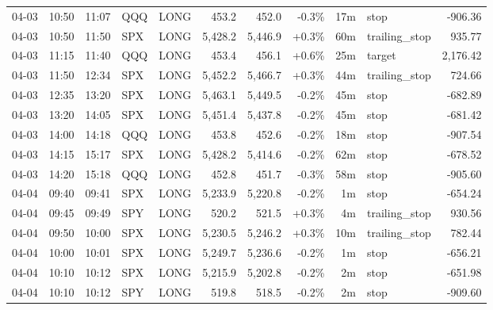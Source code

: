 \documentclass[11pt,a4paper,twoside]{article}
\begin{document}
\begin{center}
\begin{longtable}{>{\color{txtmain}}l l l l l r r r r >{\color{txtmain}}l r}
04-03 & 10:50 & 11:07 & QQQ & LONG & 453.2 & 452.0 & \textcolor{lossred}{-0.3\%} & 17m & stop & \textcolor{lossred}{-906.36} \\
04-03 & 10:50 & 11:50 & SPX & LONG & 5,428.2 & 5,446.9 & \textcolor{wingreen}{+0.3\%} & 60m & trailing\_stop & \textcolor{wingreen}{935.77} \\
04-03 & 11:15 & 11:40 & QQQ & LONG & 453.4 & 456.1 & \textcolor{wingreen}{+0.6\%} & 25m & target & \textcolor{wingreen}{2,176.42} \\
04-03 & 11:50 & 12:34 & SPX & LONG & 5,452.2 & 5,466.7 & \textcolor{wingreen}{+0.3\%} & 44m & trailing\_stop & \textcolor{wingreen}{724.66} \\
04-03 & 12:35 & 13:20 & SPX & LONG & 5,463.1 & 5,449.5 & \textcolor{lossred}{-0.2\%} & 45m & stop & \textcolor{lossred}{-682.89} \\
04-03 & 13:20 & 14:05 & SPX & LONG & 5,451.4 & 5,437.8 & \textcolor{lossred}{-0.2\%} & 45m & stop & \textcolor{lossred}{-681.42} \\
04-03 & 14:00 & 14:18 & QQQ & LONG & 453.8 & 452.6 & \textcolor{lossred}{-0.2\%} & 18m & stop & \textcolor{lossred}{-907.54} \\
04-03 & 14:15 & 15:17 & SPX & LONG & 5,428.2 & 5,414.6 & \textcolor{lossred}{-0.2\%} & 62m & stop & \textcolor{lossred}{-678.52} \\
04-03 & 14:20 & 15:18 & QQQ & LONG & 452.8 & 451.7 & \textcolor{lossred}{-0.3\%} & 58m & stop & \textcolor{lossred}{-905.60} \\
04-04 & 09:40 & 09:41 & SPX & LONG & 5,233.9 & 5,220.8 & \textcolor{lossred}{-0.2\%} & 1m & stop & \textcolor{lossred}{-654.24} \\
04-04 & 09:45 & 09:49 & SPY & LONG & 520.2 & 521.5 & \textcolor{wingreen}{+0.3\%} & 4m & trailing\_stop & \textcolor{wingreen}{930.56} \\
04-04 & 09:50 & 10:00 & SPX & LONG & 5,230.5 & 5,246.2 & \textcolor{wingreen}{+0.3\%} & 10m & trailing\_stop & \textcolor{wingreen}{782.44} \\
04-04 & 10:00 & 10:01 & SPX & LONG & 5,249.7 & 5,236.6 & \textcolor{lossred}{-0.2\%} & 1m & stop & \textcolor{lossred}{-656.21} \\
04-04 & 10:10 & 10:12 & SPX & LONG & 5,215.9 & 5,202.8 & \textcolor{lossred}{-0.2\%} & 2m & stop & \textcolor{lossred}{-651.98} \\
04-04 & 10:10 & 10:12 & SPY & LONG & 519.8 & 518.5 & \textcolor{lossred}{-0.2\%} & 2m & stop & \textcolor{lossred}{-909.60} \\

\end{longtable}
\end{center}
\end{document}
